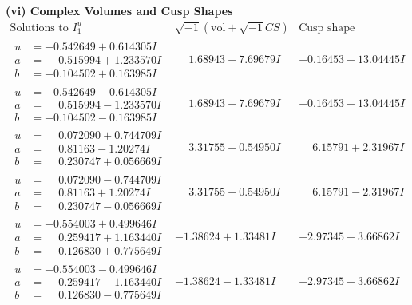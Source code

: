 \documentclass[1p]{elsarticle_modified}
\theoremstyle{definition}
\newcommand{\I}{\sqrt{-1}}
\begin{document}
\newpage\flushleft \textbf{(vi) Complex Volumes and Cusp Shapes}
$$\begin{array}{c|c|c}  
\text{Solutions to }I^u_{1}& \I (\text{vol} + \sqrt{-1}CS) & \text{Cusp shape}\\
 \hline 
\begin{aligned}
u &= -0.542649 + 0.614305 I \\
a &= \phantom{-}0.515994 + 1.233570 I \\
b &= -0.104502 + 0.163985 I\end{aligned}
 & \phantom{-}1.68943 + 7.69679 I & -0.16453 - 13.04445 I \\ \hline\begin{aligned}
u &= -0.542649 - 0.614305 I \\
a &= \phantom{-}0.515994 - 1.233570 I \\
b &= -0.104502 - 0.163985 I\end{aligned}
 & \phantom{-}1.68943 - 7.69679 I & -0.16453 + 13.04445 I \\ \hline\begin{aligned}
u &= \phantom{-}0.072090 + 0.744709 I \\
a &= \phantom{-}0.81163 - 1.20274 I \\
b &= \phantom{-}0.230747 + 0.056669 I\end{aligned}
 & \phantom{-}3.31755 + 0.54950 I & \phantom{-}6.15791 + 2.31967 I \\ \hline\begin{aligned}
u &= \phantom{-}0.072090 - 0.744709 I \\
a &= \phantom{-}0.81163 + 1.20274 I \\
b &= \phantom{-}0.230747 - 0.056669 I\end{aligned}
 & \phantom{-}3.31755 - 0.54950 I & \phantom{-}6.15791 - 2.31967 I \\ \hline\begin{aligned}
u &= -0.554003 + 0.499646 I \\
a &= \phantom{-}0.259417 + 1.163440 I \\
b &= \phantom{-}0.126830 + 0.775649 I\end{aligned}
 & -1.38624 + 1.33481 I & -2.97345 - 3.66862 I \\ \hline\begin{aligned}
u &= -0.554003 - 0.499646 I \\
a &= \phantom{-}0.259417 - 1.163440 I \\
b &= \phantom{-}0.126830 - 0.775649 I\end{aligned}
 & -1.38624 - 1.33481 I & -2.97345 + 3.66862 I \\ \hline\begin{aligned}

\end{aligned}
\end{array}$$
\end{document}
